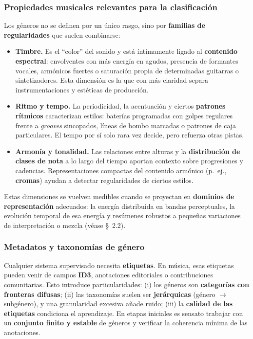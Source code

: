 \documentclass[12pt,twoside]{article}
\begin{document}
\subsubsection{Propiedades musicales relevantes para la clasificación}

Los géneros no se definen por un único rasgo, sino por \textbf{familias de regularidades} que suelen combinarse:

\begin{itemize}
  \item \textbf{Timbre.} Es el ``color'' del sonido y está íntimamente ligado al \textbf{contenido espectral}: envolventes con más energía en agudos, presencia de formantes vocales, armónicos fuertes o saturación propia de determinadas guitarras o sintetizadores. Esta dimensión es la que con más claridad separa instrumentaciones y estéticas de producción.
  \item \textbf{Ritmo y tempo.} La periodicidad, la acentuación y ciertos \textbf{patrones rítmicos} caracterizan estilos: baterías programadas con golpes regulares frente a \emph{grooves} sincopados, líneas de bombo marcadas o patrones de caja particulares. El tempo por sí solo rara vez decide, pero refuerza otras pistas.
  \item \textbf{Armonía y tonalidad.} Las relaciones entre alturas y la \textbf{distribución de clases de nota} a lo largo del tiempo aportan contexto sobre progresiones y cadencias. Representaciones compactas del contenido armónico (p.~ej., \textbf{cromas}) ayudan a detectar regularidades de ciertos estilos.
\end{itemize}

Estas dimensiones se vuelven medibles cuando se proyectan en \textbf{dominios de representación} adecuados: la energía distribuida en bandas perceptuales, la evolución temporal de esa energía y resúmenes robustos a pequeñas variaciones de interpretación o mezcla (véase \S~2.2).

\subsubsection{Metadatos y taxonomías de género}

Cualquier sistema supervisado necesita \textbf{etiquetas}. En música, esas etiquetas pueden venir de campos \textbf{ID3}, anotaciones editoriales o contribuciones comunitarias. Esto introduce particularidades: (i) los géneros son \textbf{categorías con fronteras difusas}; (ii) las taxonomías suelen ser \textbf{jerárquicas} (género $\to$ subgénero), y una granularidad excesiva añade ruido; (iii) la \textbf{calidad de las etiquetas} condiciona el aprendizaje. En etapas iniciales es sensato trabajar con un \textbf{conjunto finito y estable} de géneros y verificar la coherencia mínima de las anotaciones.
\end{document}
